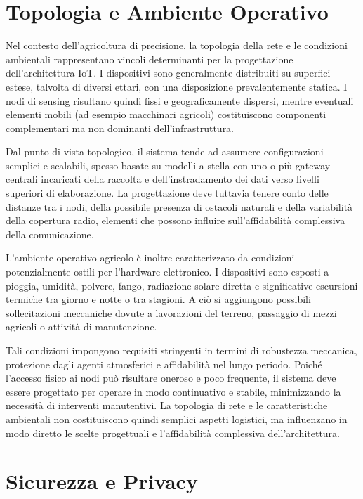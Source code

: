 \section{Topologia e Ambiente Operativo}

Nel contesto dell’agricoltura di precisione, la topologia della rete e le condizioni ambientali rappresentano vincoli determinanti per la progettazione dell’architettura IoT. I dispositivi sono generalmente distribuiti su superfici estese, talvolta di diversi ettari, con una disposizione prevalentemente statica. I nodi di sensing risultano quindi fissi e geograficamente dispersi, mentre eventuali elementi mobili (ad esempio macchinari agricoli) costituiscono componenti complementari ma non dominanti dell’infrastruttura.

Dal punto di vista topologico, il sistema tende ad assumere configurazioni semplici e scalabili, spesso basate su modelli a stella con uno o più gateway centrali incaricati della raccolta e dell’instradamento dei dati verso livelli superiori di elaborazione. La progettazione deve tuttavia tenere conto delle distanze tra i nodi, della possibile presenza di ostacoli naturali e della variabilità della copertura radio, elementi che possono influire sull’affidabilità complessiva della comunicazione.

L’ambiente operativo agricolo è inoltre caratterizzato da condizioni potenzialmente ostili per l’hardware elettronico. I dispositivi sono esposti a pioggia, umidità, polvere, fango, radiazione solare diretta e significative escursioni termiche tra giorno e notte o tra stagioni. A ciò si aggiungono possibili sollecitazioni meccaniche dovute a lavorazioni del terreno, passaggio di mezzi agricoli o attività di manutenzione.

Tali condizioni impongono requisiti stringenti in termini di robustezza meccanica, protezione dagli agenti atmosferici e affidabilità nel lungo periodo. Poiché l’accesso fisico ai nodi può risultare oneroso e poco frequente, il sistema deve essere progettato per operare in modo continuativo e stabile, minimizzando la necessità di interventi manutentivi. La topologia di rete e le caratteristiche ambientali non costituiscono quindi semplici aspetti logistici, ma influenzano in modo diretto le scelte progettuali e l’affidabilità complessiva dell’architettura.

\section{Sicurezza e Privacy}

